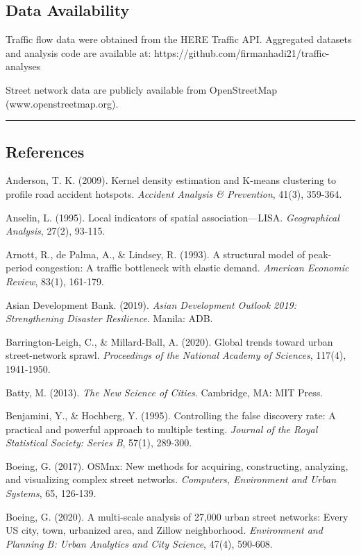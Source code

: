\documentclass[
  12pt,
]{article}
\begin{document}
\subsection{Data Availability}\label{data-availability}

Traffic flow data were obtained from the HERE Traffic API. Aggregated datasets and analysis code are available at: https://github.com/firmanhadi21/traffic-analyses

Street network data are publicly available from OpenStreetMap (www.openstreetmap.org).

\begin{center}\rule{0.5\linewidth}{0.5pt}\end{center}

\subsection{References}\label{references}

Anderson, T. K. (2009). Kernel density estimation and K-means clustering to profile road accident hotspots. \emph{Accident Analysis \& Prevention}, 41(3), 359-364.

Anselin, L. (1995). Local indicators of spatial association---LISA. \emph{Geographical Analysis}, 27(2), 93-115.

Arnott, R., de Palma, A., \& Lindsey, R. (1993). A structural model of peak-period congestion: A traffic bottleneck with elastic demand. \emph{American Economic Review}, 83(1), 161-179.

Asian Development Bank. (2019). \emph{Asian Development Outlook 2019: Strengthening Disaster Resilience}. Manila: ADB.

Barrington-Leigh, C., \& Millard-Ball, A. (2020). Global trends toward urban street-network sprawl. \emph{Proceedings of the National Academy of Sciences}, 117(4), 1941-1950.

Batty, M. (2013). \emph{The New Science of Cities}. Cambridge, MA: MIT Press.

Benjamini, Y., \& Hochberg, Y. (1995). Controlling the false discovery rate: A practical and powerful approach to multiple testing. \emph{Journal of the Royal Statistical Society: Series B}, 57(1), 289-300.

Boeing, G. (2017). OSMnx: New methods for acquiring, constructing, analyzing, and visualizing complex street networks. \emph{Computers, Environment and Urban Systems}, 65, 126-139.

Boeing, G. (2020). A multi-scale analysis of 27,000 urban street networks: Every US city, town, urbanized area, and Zillow neighborhood. \emph{Environment and Planning B: Urban Analytics and City Science}, 47(4), 590-608.
\end{document}
